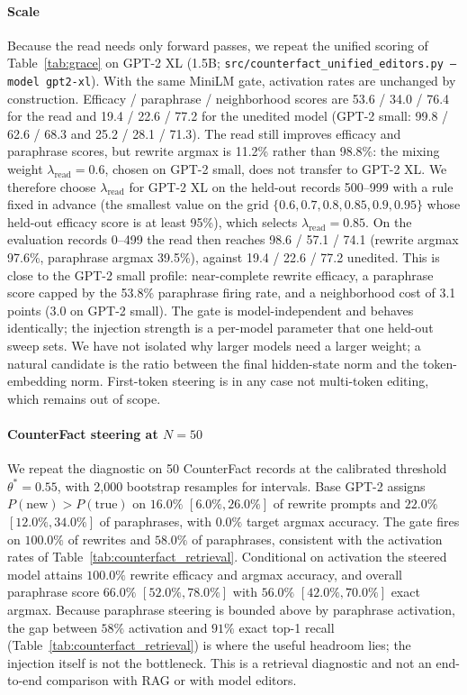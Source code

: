 \documentclass[preprint,12pt]{elsarticle}
\newif\ifmarkchanges
\newcommand{\rev}[1]{\ifmarkchanges{\color{blue}#1}\else#1\fi}
\begin{document}
\paragraph{Scale}
\rev{Because the read needs only forward passes, we repeat the unified scoring of Table~\ref{tab:grace} on GPT-2 XL (1.5B; \texttt{src/counterfact\_unified\_editors.py --model gpt2-xl}). With the same MiniLM gate, activation rates are unchanged by construction. Efficacy / paraphrase / neighborhood scores are 53.6 / 34.0 / 76.4 for the read and 19.4 / 22.6 / 77.2 for the unedited model (GPT-2 small: 99.8 / 62.6 / 68.3 and 25.2 / 28.1 / 71.3). The read still improves efficacy and paraphrase scores, but rewrite argmax is 11.2\% rather than 98.8\%: the mixing weight $\lambda_{\mathrm{read}}=0.6$, chosen on GPT-2 small, does not transfer to GPT-2 XL. We therefore choose $\lambda_{\mathrm{read}}$ for GPT-2 XL on the held-out records 500--999 with a rule fixed in advance (the smallest value on the grid $\{0.6,0.7,0.8,0.85,0.9,0.95\}$ whose held-out efficacy score is at least 95\%), which selects $\lambda_{\mathrm{read}}=0.85$. On the evaluation records 0--499 the read then reaches 98.6 / 57.1 / 74.1 (rewrite argmax 97.6\%, paraphrase argmax 39.5\%), against 19.4 / 22.6 / 77.2 unedited. This is close to the GPT-2 small profile: near-complete rewrite efficacy, a paraphrase score capped by the 53.8\% paraphrase firing rate, and a neighborhood cost of 3.1 points (3.0 on GPT-2 small). The gate is model-independent and behaves identically; the injection strength is a per-model parameter that one held-out sweep sets. We have not isolated why larger models need a larger weight; a natural candidate is the ratio between the final hidden-state norm and the token-embedding norm. First-token steering is in any case not multi-token editing, which remains out of scope.}

\paragraph{CounterFact steering at $N=50$}
We repeat the diagnostic on 50 CounterFact records at the calibrated threshold $\theta^* = 0.55$, with 2,000 bootstrap resamples for intervals. Base GPT-2 assigns $P(\mathrm{new}) > P(\mathrm{true})$ on $16.0\%$ $[6.0\%, 26.0\%]$ of rewrite prompts and $22.0\%$ $[12.0\%, 34.0\%]$ of paraphrases, with $0.0\%$ target argmax accuracy. The gate fires on $100.0\%$ of rewrites and $58.0\%$ of paraphrases, consistent with the activation rates of Table~\ref{tab:counterfact_retrieval}. Conditional on activation the steered model attains $100.0\%$ rewrite efficacy and argmax accuracy, and overall paraphrase score $66.0\%$ $[52.0\%, 78.0\%]$ with $56.0\%$ $[42.0\%, 70.0\%]$ exact argmax. Because paraphrase steering is bounded above by paraphrase activation, the gap between $58\%$ activation and $91\%$ exact top-1 recall (Table~\ref{tab:counterfact_retrieval}) is where the useful headroom lies; the injection itself is not the bottleneck. This is a retrieval diagnostic and not an end-to-end comparison with RAG or with model editors.
\end{document}
